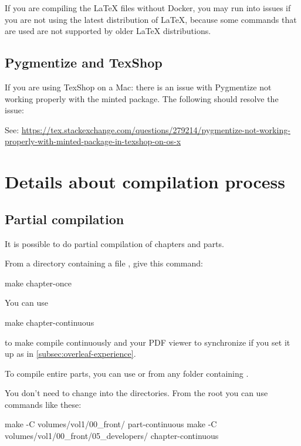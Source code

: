 If you are compiling the LaTeX files without Docker, you may run into issues if you are not using the latest distribution of LaTeX, because some commands that are used are not supported by older LaTeX distributions.

\subsection{Pygmentize and TexShop}

If you are using TexShop on a Mac: there is an issue with Pygmentize not working properly with the minted package.
The following should resolve the issue:


See: \url{https://tex.stackexchange.com/questions/279214/pygmentize-not-working-properly-with-minted-package-in-texshop-on-os-x}

\section{Details about compilation process}

\subsection{Partial compilation}

It is possible to do partial compilation of chapters and parts.

From a directory containing a file , give this command:
%
\begin{console}
    make chapter-once
\end{console}

You can use
%
\begin{console}
    make chapter-continuous
\end{console}
%
to make  compile continuously and your PDF viewer to synchronize if you set it up as in \cref{subsec:overleaf-experience}.

To compile entire parts, you can use  or  from any folder containing .

You don't need to change into the directories.
From the root you can use commands like these:
%
\begin{console}
    make -C volumes/vol1/00_front/ part-continuous
    make -C volumes/vol1/00_front/05_developers/ chapter-continuous
\end{console}

